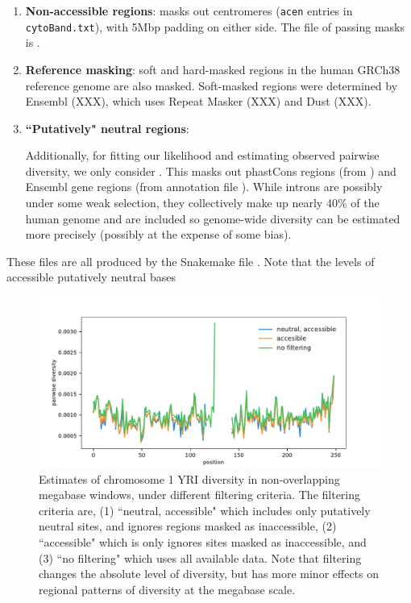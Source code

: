 \documentclass[11pt]{article}
\begin{document}
\begin{enumerate}
  \item \textbf{Non-accessible regions}: masks out centromeres (\texttt{acen} entries in
    \texttt{cytoBand.txt}), with 5Mbp padding on either side. The file of
    passing masks is . 

  \item \textbf{Reference masking}: soft and hard-masked regions in the human
      GRCh38 reference genome are also masked. Soft-masked regions were
      determined by Ensembl (XXX), which uses Repeat Masker (XXX) and Dust
      (XXX).

  \item \textbf{``Putatively" neutral regions}: 


      Additionally, for fitting our
    likelihood and estimating observed pairwise diversity, we only consider .
    This masks out phastCons regions (from
    ) and Ensembl gene regions (from
    annotation file ).  While introns
    are possibly under some weak selection, they collectively make up nearly
    40\% of the human genome and are included so genome-wide diversity can be
    estimated more precisely (possibly at the expense of some bias).
\end{enumerate}

These files are all produced by the Snakemake file .
Note that the levels of accessible putatively neutral bases 

\begin{figure}[!htb]
  \centering
  \includegraphics{figures/supplementary/chr1_diversity_filtering.pdf}

  \caption{Estimates of chromosome 1 YRI diversity in non-overlapping megabase
    windows, under different filtering criteria. The filtering criteria are,
    (1) ``neutral, accessible" which includes only putatively neutral sites, and
    ignores regions masked as inaccessible, (2) ``accessible" which is only ignores
  sites masked as inaccessible, and (3) ``no filtering" which uses all available
data. Note that filtering changes the absolute level of diversity, but has more
minor effects on regional patterns of diversity at the megabase scale.}

  \label{suppfig:chr1-diversity}
\end{figure}
\end{document}

